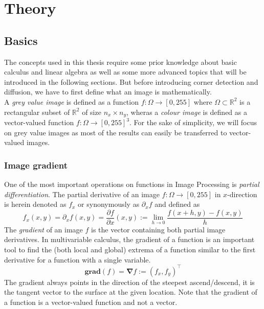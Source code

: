 \newcommand{\TODO}[1]{\\ \textbf{\textcolor{red}{!! #1 !!}}\\}
\chapter{Theory}\label{ch:Theory}

\section{Basics}\label{sec:Basics}
The concepts used in this thesis require some prior knowledge about basic calculus and linear
algebra as well as some more advanced topics that will be introduced in the following sections.
But before introducing corner detection and diffusion, we have to first define what an image is
mathematically.\\
A \textit{grey value image} is defined as a function $f: \Omega \rightarrow [0, 255]$ where
$\Omega \subset \mathbb{R}^2$ is a rectangular subset of $\mathbb{R}^2$ of size $n_x\times n_y$,
wheras a
\textit{colour image} is defined as a vector-valued function $f: \Omega \rightarrow [0, 255]^3$.
For the sake of simplicity, we will focus on grey value images as most of the results can easily be
transferred to vector-valued images.

\subsection{Image gradient}
One of the most important operations on functions in Image Processing is \textit{partial
    differentiation}.
The partial derivative of an image $f: \Omega \rightarrow [0, 255]$ in $x$-direction is herein denoted as $f_x$ or
synonymously as $\partial_x f$ and defined as
\begin{equation}
    f_x(x, y) = \partial_x f (x, y) = \frac{\partial f}{\partial x} (x, y) := \lim_{h \to 0}\frac{f(x+h, y) -f(x, y)}{h} 
\end{equation}
The \textit{gradient} of an image $f$ is the vector containing both partial image derivatives.
In multivariable calculus, the gradient of a function is an important tool to find the (both local
and global) extrema of a function similar to the first derivative for a function with a single
variable.
\begin{equation}
    \textbf{grad}(f) = \boldsymbol\nabla f := \left(f_x, f_y\right)^\top
\end{equation}
The gradient always points in the direction of the steepest ascend/descend, it is the tangent
vector to the surface at the given location\cite{mfi3}.
Note that the gradient of a function is a vector-valued function and not a vector.

